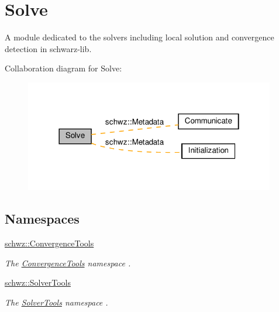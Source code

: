 \hypertarget{group__solve}{}\section{Solve}
\label{group__solve}


A module dedicated to the solvers including local solution and convergence detection in schwarz-\/lib.  


Collaboration diagram for Solve\+:
\nopagebreak
\begin{figure}[H]
\begin{center}
\leavevmode
\includegraphics[width=310pt]{group__solve}
\end{center}
\end{figure}
\subsection*{Namespaces}
\begin{DoxyCompactItemize}
\item 
 \hyperlink{namespaceschwz_1_1ConvergenceTools}{schwz\+::\+Convergence\+Tools}
\begin{DoxyCompactList}\small\item\em The \hyperlink{namespaceschwz_1_1ConvergenceTools}{Convergence\+Tools} namespace . \end{DoxyCompactList}\item 
 \hyperlink{namespaceschwz_1_1SolverTools}{schwz\+::\+Solver\+Tools}
\begin{DoxyCompactList}\small\item\em The \hyperlink{namespaceschwz_1_1SolverTools}{Solver\+Tools} namespace . \end{DoxyCompactList}\end{DoxyCompactItemize}
